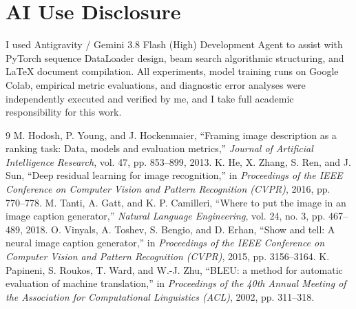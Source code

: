 \documentclass[10pt,conference,a4paper]{IEEEtran}
\begin{document}
\section*{AI Use Disclosure}
I used Antigravity / Gemini 3.8 Flash (High) Development Agent to assist with PyTorch sequence DataLoader design, beam search algorithmic structuring, and LaTeX document compilation. All experiments, model training runs on Google Colab, empirical metric evaluations, and diagnostic error analyses were independently executed and verified by me, and I take full academic responsibility for this work.

\begin{thebibliography}{9}
M. Hodosh, P. Young, and J. Hockenmaier, ``Framing image description as a ranking task: Data, models and evaluation metrics,'' \emph{Journal of Artificial Intelligence Research}, vol. 47, pp. 853--899, 2013.
K. He, X. Zhang, S. Ren, and J. Sun, ``Deep residual learning for image recognition,'' in \emph{Proceedings of the IEEE Conference on Computer Vision and Pattern Recognition (CVPR)}, 2016, pp. 770--778.
M. Tanti, A. Gatt, and K. P. Camilleri, ``Where to put the image in an image caption generator,'' \emph{Natural Language Engineering}, vol. 24, no. 3, pp. 467--489, 2018.
O. Vinyals, A. Toshev, S. Bengio, and D. Erhan, ``Show and tell: A neural image caption generator,'' in \emph{Proceedings of the IEEE Conference on Computer Vision and Pattern Recognition (CVPR)}, 2015, pp. 3156--3164.
K. Papineni, S. Roukos, T. Ward, and W.-J. Zhu, ``BLEU: a method for automatic evaluation of machine translation,'' in \emph{Proceedings of the 40th Annual Meeting of the Association for Computational Linguistics (ACL)}, 2002, pp. 311--318.
\end{thebibliography}
\end{document}
